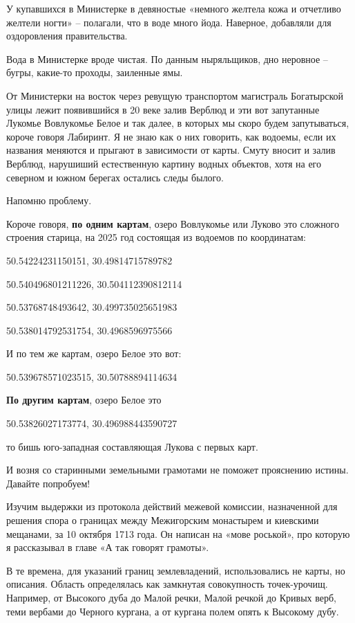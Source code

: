 У купавшихся в Министерке в девяностые «немного желтела кожа и отчетливо желтели ногти» – полагали, что в воде много йода. Наверное, добавляли для оздоровления правительства.

Вода в Министерке вроде чистая. По данным ныряльщиков, дно неровное – бугры, какие-то проходы, заиленные ямы.

От Министерки на восток через ревущую транспортом магистраль Богатырской улицы лежит появившийся в 20 веке залив Верблюд и эти вот запутанные Лукомье Вовлукомье Белое и так далее, в которых мы скоро будем запутываться, короче говоря Лабиринт. Я не знаю как о них говорить, как водоемы, если их названия меняются и прыгают в зависимости от карты. Смуту вносит и залив Верблюд, нарушиший естественную картину водных объектов, хотя на его северном и южном берегах остались следы былого.

Напомню проблему. 

Короче говоря, \textbf{по одним  картам}, озеро Вовлукомье или Луково это сложного строения старица, на 2025 год состоящая из водоемов по координатам:

50.54224231150151, 30.49814715789782

50.540496801211226, 30.504112390812114

50.53768748493642, 30.499735025651983

50.538014792531754, 30.4968596975566

И по тем же картам, озеро Белое это вот:

50.539678571023515, 30.50788894114634

\textbf{По другим картам}, озеро Белое это

50.53826027173774, 30.496988443590727

то бишь юго-западная составляющая Лукова с первых карт.

И возня со старинными земельными грамотами не поможет прояснению истины. Давайте попробуем!

Изучим выдержки из протокола действий межевой комиссии, назначенной для решения спора о границах между Межигорским монастырем и киевскими мещанами, за 10 октября 1713 года\cite{sbornikmat}. Он написан на «мове роськой», про которую я рассказывал в главе «А так говорят грамоты».

В те времена, для указаний границ землевладений, использовались не карты, но описания. Область определялась как замкнутая совокупность точек-урочищ. Например, от Высокого дуба до Малой речки, Малой речкой до Кривых верб, теми вербами до Черного кургана, а от кургана полем опять к Высокому дубу.

